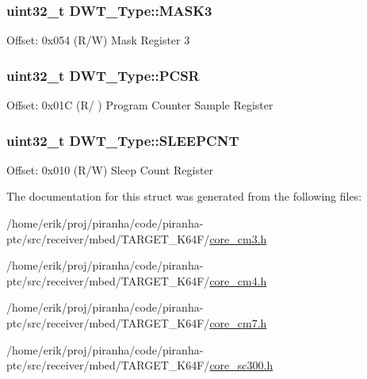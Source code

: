 \subsubsection[{\texorpdfstring{M\+A\+S\+K3}{MASK3}}]{ uint32\+\_\+t D\+W\+T\+\_\+\+Type\+::\+M\+A\+S\+K3}\hypertarget{structDWT__Type_ae3f01137a8d28c905ddefe7333547fba}{}\label{structDWT__Type_ae3f01137a8d28c905ddefe7333547fba}
Offset\+: 0x054 (R/W) Mask Register 3 
\subsubsection[{\texorpdfstring{P\+C\+SR}{PCSR}}]{ uint32\+\_\+t D\+W\+T\+\_\+\+Type\+::\+P\+C\+SR}\hypertarget{structDWT__Type_abc5ae11d98da0ad5531a5e979a3c2ab5}{}\label{structDWT__Type_abc5ae11d98da0ad5531a5e979a3c2ab5}
Offset\+: 0x01C (R/ ) Program Counter Sample Register 
\subsubsection[{\texorpdfstring{S\+L\+E\+E\+P\+C\+NT}{SLEEPCNT}}]{ uint32\+\_\+t D\+W\+T\+\_\+\+Type\+::\+S\+L\+E\+E\+P\+C\+NT}\hypertarget{structDWT__Type_a8afd5a4bf994011748bc012fa442c74d}{}\label{structDWT__Type_a8afd5a4bf994011748bc012fa442c74d}
Offset\+: 0x010 (R/W) Sleep Count Register 

The documentation for this struct was generated from the following files\+:\begin{DoxyCompactItemize}
\item 
/home/erik/proj/piranha/code/piranha-\/ptc/src/receiver/mbed/\+T\+A\+R\+G\+E\+T\+\_\+\+K64\+F/\hyperlink{core__cm3_8h}{core\+\_\+cm3.\+h}\item 
/home/erik/proj/piranha/code/piranha-\/ptc/src/receiver/mbed/\+T\+A\+R\+G\+E\+T\+\_\+\+K64\+F/\hyperlink{core__cm4_8h}{core\+\_\+cm4.\+h}\item 
/home/erik/proj/piranha/code/piranha-\/ptc/src/receiver/mbed/\+T\+A\+R\+G\+E\+T\+\_\+\+K64\+F/\hyperlink{core__cm7_8h}{core\+\_\+cm7.\+h}\item 
/home/erik/proj/piranha/code/piranha-\/ptc/src/receiver/mbed/\+T\+A\+R\+G\+E\+T\+\_\+\+K64\+F/\hyperlink{core__sc300_8h}{core\+\_\+sc300.\+h}\end{DoxyCompactItemize}
